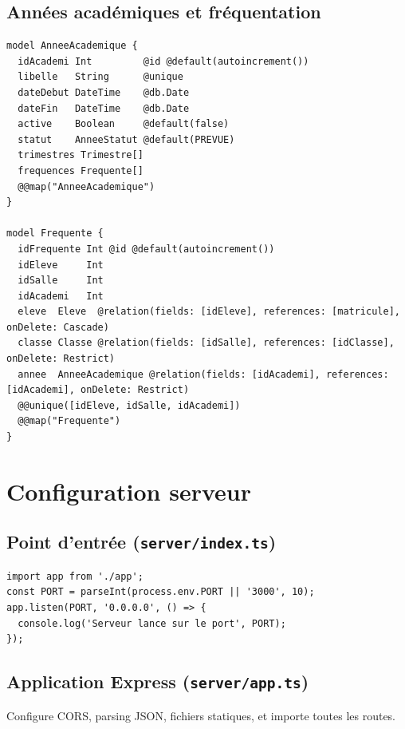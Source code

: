\documentclass[12pt,a4paper]{article}
\begin{document}
\subsection{Années académiques et fréquentation}

\begin{lstlisting}[style=code]
model AnneeAcademique {
  idAcademi Int         @id @default(autoincrement())
  libelle   String      @unique
  dateDebut DateTime    @db.Date
  dateFin   DateTime    @db.Date
  active    Boolean     @default(false)
  statut    AnneeStatut @default(PREVUE)
  trimestres Trimestre[]
  frequences Frequente[]
  @@map("AnneeAcademique")
}

model Frequente {
  idFrequente Int @id @default(autoincrement())
  idEleve     Int
  idSalle     Int
  idAcademi   Int
  eleve  Eleve  @relation(fields: [idEleve], references: [matricule], onDelete: Cascade)
  classe Classe @relation(fields: [idSalle], references: [idClasse], onDelete: Restrict)
  annee  AnneeAcademique @relation(fields: [idAcademi], references: [idAcademi], onDelete: Restrict)
  @@unique([idEleve, idSalle, idAcademi])
  @@map("Frequente")
}
\end{lstlisting}

\newpage

\section{Configuration serveur}

\subsection{Point d'entrée (\texttt{server/index.ts})}

\begin{lstlisting}[style=code]
import app from './app';
const PORT = parseInt(process.env.PORT || '3000', 10);
app.listen(PORT, '0.0.0.0', () => {
  console.log('Serveur lance sur le port', PORT);
});
\end{lstlisting}

\subsection{Application Express (\texttt{server/app.ts})}

Configure CORS, parsing JSON, fichiers statiques, et importe toutes les routes.
\end{document}
